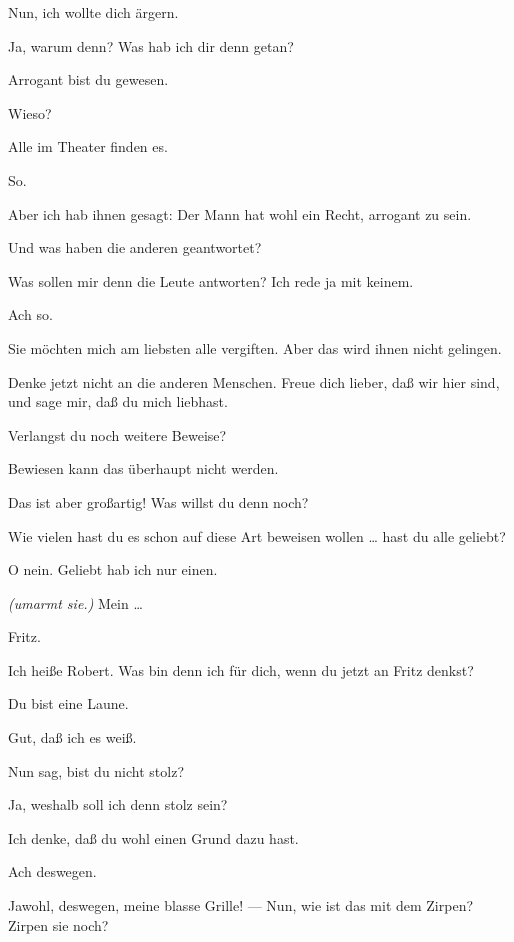 \documentclass[
	final,
	a4paper,
	ngerman,
	mpinclude = true, %
	twoside = true,
	open = right,
	cleardoublepage = plain,
	DIV = 13,
	BCOR = 1cm,
	titlepage = firstiscover,
	]{scrbook}
\newcommand{\direction}[1]{\textit{(#1)}}
\newcommand{\thecharacter}[1]{\textup{\textsc{#1}}\xspace}
\newcommand{\thedichter}{\thecharacter{Dichter}}
\newcommand{\theschauspielerin}{\thecharacter{Schauspielerin}}
\newcommand{\character}[1]{\item[#1:]}
\newcommand{\dichter}{\character{\thedichter}}
\newcommand{\schauspielerin}{\character{\theschauspielerin}}
\begin{document}
\begin{play}
	\schauspielerin
	Nun, ich wollte dich ärgern.

	\dichter
	Ja, warum denn? Was hab ich dir denn getan?

	\schauspielerin
	Arrogant bist du gewesen.

	\dichter
	Wieso?

	\schauspielerin
	Alle im Theater finden es.

	\dichter
	So.

	\schauspielerin
	Aber ich hab ihnen gesagt: Der Mann hat wohl ein Recht, arrogant zu sein.

	\dichter
	Und was haben die anderen geantwortet?

	\schauspielerin
	Was sollen mir denn die Leute antworten? Ich rede ja mit keinem.

	\dichter
	Ach so.

	\schauspielerin
	Sie möchten mich am liebsten alle vergiften. Aber das wird ihnen nicht gelingen.

	\dichter
	Denke jetzt nicht an die anderen Menschen. Freue dich lieber, daß wir hier sind, und sage mir, daß du mich liebhast.

	\schauspielerin
	Verlangst du noch weitere Beweise?

	\dichter
	Bewiesen kann das überhaupt nicht werden.

	\schauspielerin
	Das ist aber großartig! Was willst du denn noch?

	\dichter
	Wie vielen hast du es schon auf diese Art beweisen wollen \ldots{} hast du alle geliebt?

	\schauspielerin
	O nein. Geliebt hab ich nur einen.

	\dichter
	\direction{umarmt sie.} Mein \ldots{}

	\schauspielerin
	Fritz.

	\dichter
	Ich heiße Robert. Was bin denn ich für dich, wenn du jetzt an Fritz denkst?

	\schauspielerin
	Du bist eine Laune.

	\dichter
	Gut, daß ich es weiß.

	\schauspielerin
	Nun sag, bist du nicht stolz?

	\dichter
	Ja, weshalb soll ich denn stolz sein?

	\schauspielerin
	Ich denke, daß du wohl einen Grund dazu hast.

	\dichter
	Ach deswegen.

	\schauspielerin
	Jawohl, deswegen, meine blasse Grille! --- Nun, wie ist das mit dem Zirpen? Zirpen sie noch?


\end{play}
\end{document}
